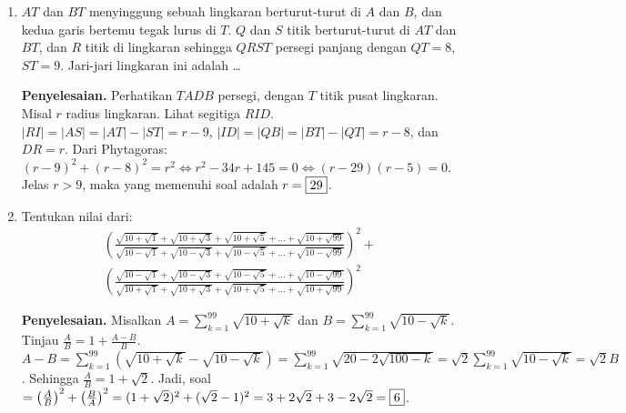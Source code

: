 \documentclass[12pt]{scrartcl}
\begin{document}
\begin{enumerate}
    \item $AT$ dan $BT$ menyinggung sebuah lingkaran berturut-turut di $A$ dan $B$, dan kedua garis bertemu tegak lurus di $T$. $Q$ dan $S$ titik berturut-turut di $AT$ dan $BT$, dan $R$ titik di lingkaran sehingga $QRST$ persegi panjang dengan $QT=8$, $ST=9$. Jari-jari lingkaran ini adalah \dots
    
    \textbf{Penyelesaian.} Perhatikan $TADB$ persegi, dengan $T$ titik pusat lingkaran. Misal $r$ radius lingkaran. Lihat segitiga $RID$. $|RI|=|AS|=|AT|-|ST|=r-9$, $|ID|=|QB|=|BT|-|QT|=r-8$, dan $DR=r$. Dari Phytagoras:
    $(r-9)^2+(r-8)^2 = r^2 \iff r^2-34r+145 = 0 \iff (r-29)(r-5) = 0$.
    Jelas $r>9$, maka yang memenuhi soal adalah $r=\fbox{29}$.
    
    \item Tentukan nilai dari:
    \begin{align*}
        \left(\frac{\sqrt{10+\sqrt{1}}+\sqrt{10+\sqrt{3}}+\sqrt{10+\sqrt{5}}+\dots+\sqrt{10+\sqrt{99}}}{\sqrt{10-\sqrt{1}}+\sqrt{10-\sqrt{3}}+\sqrt{10-\sqrt{5}}+\dots+\sqrt{10-\sqrt{99}}}\right)^2 +\\ \left(\frac{\sqrt{10-\sqrt{1}}+\sqrt{10-\sqrt{3}}+\sqrt{10-\sqrt{5}}+\dots+\sqrt{10-\sqrt{99}}}{\sqrt{10+\sqrt{1}}+\sqrt{10+\sqrt{3}}+\sqrt{10+\sqrt{5}}+\dots+\sqrt{10+\sqrt{99}}}\right)^2 
    \end{align*}
    
    \textbf{Penyelesaian.} Misalkan $A = \sum_{k=1}^{99} \sqrt{10+\sqrt{k}}$ dan $B = \sum_{k=1}^{99} \sqrt{10-\sqrt{k}}$. Tinjau $\frac{A}{B} = 1 + \frac{A-B}{B}$.
    $A-B = \sum_{k=1}^{99} \left(\sqrt{10+\sqrt{k}} - \sqrt{10-\sqrt{k}}\right) = \sum_{k=1}^{99} \sqrt{20-2\sqrt{100-k}} = \sqrt{2} \sum_{k=1}^{99} \sqrt{10-\sqrt{k}} = \sqrt{2}B$.
    Sehingga $\frac{A}{B} = 1+\sqrt{2}$. Jadi, soal $= \left(\frac{A}{B}\right)^2 + \left(\frac{B}{A}\right)^2 = (1+\sqrt{2})^2 + (\sqrt{2}-1)^2 = 3+2\sqrt{2}+3-2\sqrt{2} = \fbox{6}$.
\end{enumerate}
\end{document}
